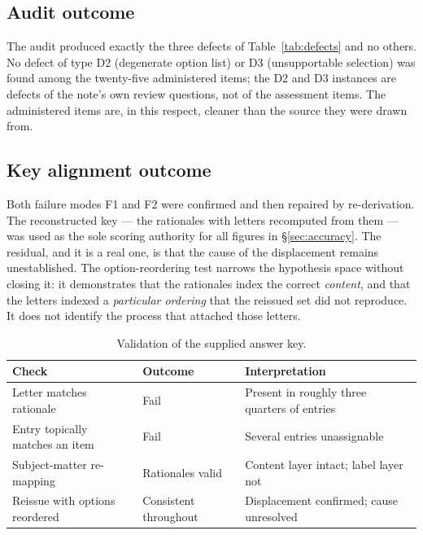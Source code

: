 \documentclass[11pt]{article}
\begin{document}
\subsection{Audit outcome}

The audit produced exactly the three defects of Table~\ref{tab:defects} and
no others. No defect of type D2 (degenerate option list) or D3
(unsupportable selection) was found among the twenty-five administered items;
the D2 and D3 instances are defects of the note's own review questions, not
of the assessment items. The administered items are, in this respect,
cleaner than the source they were drawn from.

\subsection{Key alignment outcome}

Both failure modes F1 and F2 were confirmed and then repaired by
re-derivation. The reconstructed key --- the rationales with letters
recomputed from them --- was used as the sole scoring authority for all
figures in \S\ref{sec:accuracy}. The residual, and it is a real one, is
that the cause of the displacement remains unestablished. The
option-reordering test narrows the hypothesis space without closing it: it
demonstrates that the rationales index the correct \emph{content}, and that
the letters indexed a \emph{particular ordering} that the reissued set did
not reproduce. It does not identify the process that attached those letters.

\begin{table}[htbp]
\centering
\caption{Validation of the supplied answer key.}
\label{tab:keycheck}
\begin{tabular}{@{}p{}p{}p{}@{}}
\toprule
Check & Outcome & Interpretation \\
\midrule
Letter matches rationale & Fail & Present in roughly three quarters of entries \\
Entry topically matches an item & Fail & Several entries unassignable \\
Subject-matter re-mapping & Rationales valid &
Content layer intact; label layer not \\
Reissue with options reordered & Consistent throughout &
Displacement confirmed; cause unresolved \\
\bottomrule
\end{tabular}
\end{table}
\end{document}
